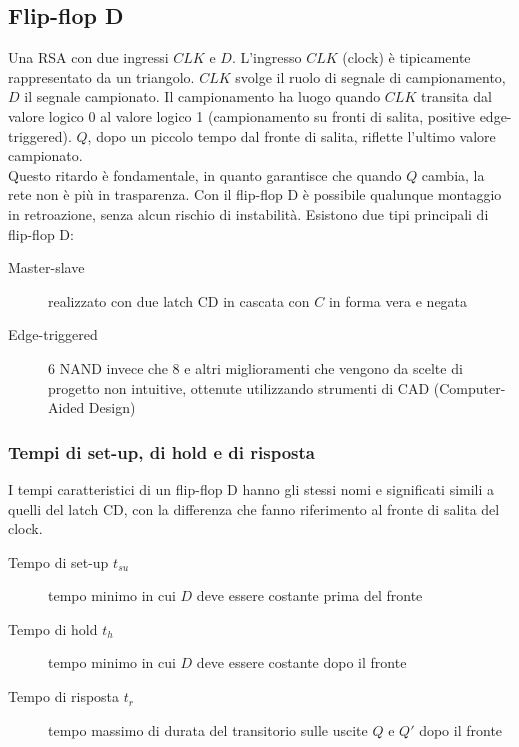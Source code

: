 \documentclass{subfiles}
\begin{document}
\subsection{Flip-flop D}

Una RSA con due ingressi $CLK$ e $D$.
L'ingresso $CLK$ (clock) è tipicamente rappresentato da un triangolo.
$CLK$ svolge il ruolo di segnale di campionamento, $D$ il segnale campionato.
Il campionamento ha luogo quando $CLK$ transita dal valore logico 0 al valore logico 1 (campionamento su fronti di salita, positive edge-triggered).
$Q$, dopo un piccolo tempo dal fronte di salita, riflette l'ultimo valore campionato.\\

\noindent
Questo ritardo è fondamentale, in quanto garantisce che quando $Q$ cambia, la rete non è più in trasparenza.
Con il flip-flop D è possibile qualunque montaggio in retroazione, senza alcun rischio di instabilità.
Esistono due tipi principali di flip-flop D:

\begin{description}
    \item[Master-slave] realizzato con due latch CD in cascata con $C$ in forma vera e negata
    \item[Edge-triggered] 6 NAND invece che 8 e altri miglioramenti che vengono da scelte di progetto non intuitive, ottenute utilizzando strumenti di CAD (Computer-Aided Design)
\end{description}

\subsubsection{Tempi di set-up, di hold e di risposta}

I tempi caratteristici di un flip-flop D hanno gli stessi nomi e significati simili a quelli del latch CD, con la differenza che fanno riferimento al fronte di salita del clock.

\begin{description}
    \item[Tempo di set-up $t_{su}$] tempo minimo in cui $D$ deve essere costante prima del fronte
    \item[Tempo di hold $t_h$] tempo minimo in cui $D$ deve essere costante dopo il fronte
    \item[Tempo di risposta $t_r$] tempo massimo di durata del transitorio sulle uscite $Q$ e $Q'$ dopo il fronte
\end{description}
\end{document}
